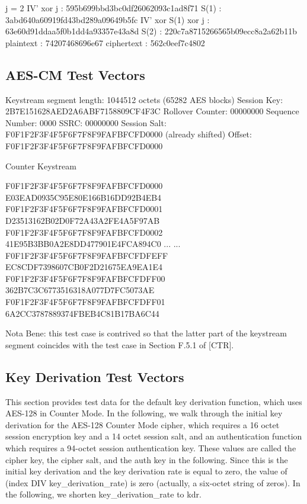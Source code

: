 \documentclass{article}
\begin{document}
j = 2 IV' xor j           :   595b699bbd3bc0df26062093c1ad8f71 S(1)                :   3abd640a60919fd43bd289a09649b5fc IV' xor S(1) xor j  :   63e60d91ddaa5f0b1dd4a93357e43a8d S(2)                :   220c7a8715266565b09ecc8a2a62b11b plaintext           :   74207468696e67 ciphertext          :   562c0eef7c4802

\subsection{AES-CM Test Vectors}

Keystream segment length: 1044512 octets (65282 AES blocks) Session Key:      2B7E151628AED2A6ABF7158809CF4F3C Rollover Counter: 00000000 Sequence Number:  0000 SSRC:             00000000 Session Salt:     F0F1F2F3F4F5F6F7F8F9FAFBFCFD0000 (already shifted) Offset:           F0F1F2F3F4F5F6F7F8F9FAFBFCFD0000

Counter                            Keystream

F0F1F2F3F4F5F6F7F8F9FAFBFCFD0000   E03EAD0935C95E80E166B16DD92B4EB4 F0F1F2F3F4F5F6F7F8F9FAFBFCFD0001   D23513162B02D0F72A43A2FE4A5F97AB F0F1F2F3F4F5F6F7F8F9FAFBFCFD0002   41E95B3BB0A2E8DD477901E4FCA894C0 ...                                ... F0F1F2F3F4F5F6F7F8F9FAFBFCFDFEFF   EC8CDF7398607CB0F2D21675EA9EA1E4 F0F1F2F3F4F5F6F7F8F9FAFBFCFDFF00   362B7C3C6773516318A077D7FC5073AE F0F1F2F3F4F5F6F7F8F9FAFBFCFDFF01   6A2CC3787889374FBEB4C81B17BA6C44

Nota Bene: this test case is contrived so that the latter part of the keystream segment coincides with the test case in Section F.5.1 of [CTR].

\subsection{Key Derivation Test Vectors}

This section provides test data for the default key derivation function, which uses AES-128 in Counter Mode.  In the following, we walk through the initial key derivation for the AES-128 Counter Mode cipher, which requires a 16 octet session encryption key and a 14 octet session salt, and an authentication function which requires a 94-octet session authentication key.  These values are called the cipher key, the cipher salt, and the auth key in the following. Since this is the initial key derivation and the key derivation rate is equal to zero, the value of (index DIV key\_derivation\_rate) is zero (actually, a six-octet string of zeros).  In the following, we shorten key\_derivation\_rate to kdr.
\end{document}

